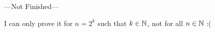 ---Not Finished---

I can only prove it for $n=2^k$ such that $k\in\mathbb{N}$, not for all $n\in\mathbb{N}$ :( 















































































